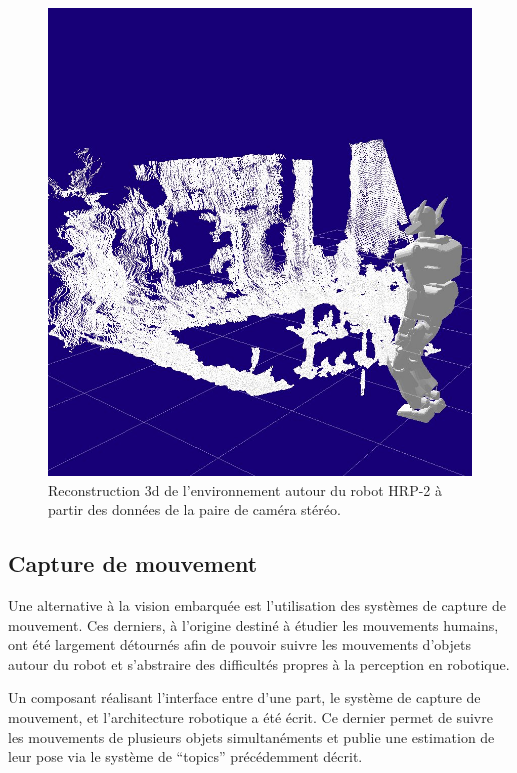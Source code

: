 \begin{figure}
  \begin{center}
    \includegraphics[width=.95\linewidth]{src/chap4-integration/stereo1.jpg}
  \end{center}
  \caption{Reconstruction 3d de l'environnement autour du robot HRP-2
    à partir des données de la paire de caméra stéréo.}
\end{figure}


\subsection{Capture de mouvement}

Une alternative à la vision embarquée est l'utilisation des systèmes
de capture de mouvement. Ces derniers, à l'origine destiné à étudier
les mouvements humains, ont été largement détournés afin de pouvoir
suivre les mouvements d'objets autour du robot et s'abstraire des
difficultés propres à la perception en robotique.


Un composant réalisant l'interface entre d'une part, le système de
capture de mouvement, et l'architecture robotique a été écrit. Ce
dernier permet de suivre les mouvements de plusieurs objets
simultanéments et publie une estimation de leur pose via le système de
``topics'' précédemment décrit.


